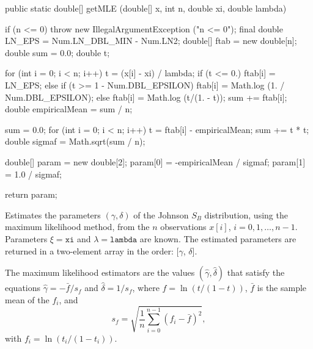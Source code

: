 \begin{code}

   public static double[] getMLE (double[] x, int n,
                                  double xi, double lambda) \begin{hide} {
      if (n <= 0)
         throw new IllegalArgumentException ("n <= 0");
      final double LN_EPS = Num.LN_DBL_MIN - Num.LN2;
      double[] ftab = new double[n];
      double sum = 0.0;
      double t;

      for (int i = 0; i < n; i++) {
         t = (x[i] - xi) / lambda;
         if (t <= 0.)
            ftab[i] = LN_EPS;
         else if (t >= 1 - Num.DBL_EPSILON)
            ftab[i] = Math.log (1. / Num.DBL_EPSILON);
         else
            ftab[i] = Math.log (t/(1. - t));
         sum += ftab[i];
      }
      double empiricalMean = sum / n;

      sum = 0.0;
      for (int i = 0; i < n; i++) {
         t = ftab[i] - empiricalMean;
         sum += t * t;
      }
      double sigmaf = Math.sqrt(sum / n);

      double[] param = new double[2];
      param[0] = -empiricalMean / sigmaf;
      param[1] = 1.0 / sigmaf;

      return param;
   }\end{hide}
\end{code}
\begin{tabb}
  Estimates the parameters $(\gamma,\delta)$ of the Johnson $S_B$ distribution,
   using the maximum likelihood method, from the $n$ observations
   $x[i]$, $i = 0, 1,\ldots, n-1$.
   Parameters $\xi = \texttt{xi}$ and $\lambda = \texttt{lambda}$ are known.
   The estimated parameters are returned in a two-element
    array  in the order: [$\gamma$, $\delta$].
   \begin{detailed}
   The maximum likelihood estimators are the values $(\hat\gamma , \hat\delta)$
   that satisfy the equations \cite{tFLY06a}
   $\hat\gamma = -\bar f / s_f$ and $\hat\delta = 1/s_f$,
   where $f = \ln (t/(1-t))$, $\bar f$ is the sample mean of the $f_i$, and
   \[
   s_f = \sqrt{\frac 1n \sum_{i=0}^{n-1} (f_i - \bar f)^2},
   \]
   with $f_i = \ln (t_i/(1-t_i))$.
   \end{detailed}
\end{tabb}
\begin{htmlonly}
\end{htmlonly}
